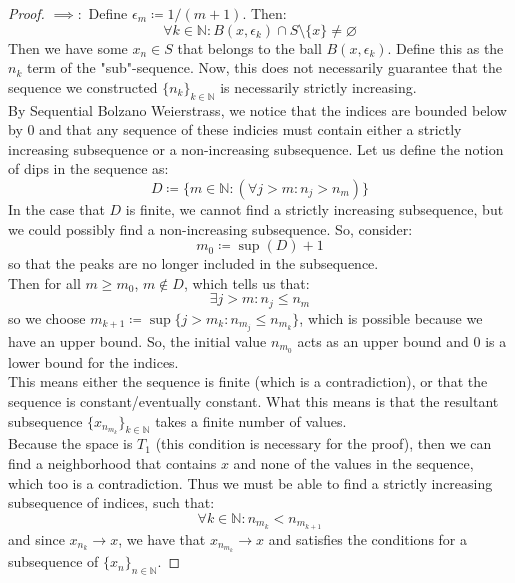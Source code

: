 \documentclass[10pt,letterpaper]{article} %
\begin{document}
\begin{proof}
$\implies:$ Define $\epsilon_m \coloneq 1/(m+1)$. Then:
\begin{equation*}
\forall k \in \mathbb{N}: B(x, \epsilon_k) \cap S \setminus \{x\} \neq \varnothing
\end{equation*}
Then we have some $x_n \in S$ that belongs to the ball $B(x, \epsilon_k)$. Define this as the $n_k$ term of the "sub"-sequence. Now, this does not necessarily guarantee that the sequence we constructed $\{n_k\}_{k \in \mathbb{N}}$ is necessarily strictly increasing.\\

By Sequential Bolzano Weierstrass, we notice that the indices are bounded below by $0$ and that any sequence of these indicies must contain either a strictly increasing subsequence or a non-increasing subsequence. Let us define the notion of dips in the sequence as:
\begin{equation*}
D \coloneq \{m \in \mathbb{N}: (\forall j > m: n_j > n_m)\}
\end{equation*}
In the case that $D$ is finite, we cannot find a strictly increasing subsequence, but we could possibly find a non-increasing subsequence. So, consider:
\begin{equation*}
m_0 \coloneq \sup (D) + 1
\end{equation*}
so that the peaks are no longer included in the subsequence.\\ 

Then for all $m \geqslant m_0$, $m \notin D$, which tells us that:
\begin{equation*}
\exists j > m: n_j \leqslant n_m
\end{equation*}
so we choose $m_{k+1} \coloneq \sup\{j > m_k : n_{m_j} \leqslant n_{m_k}\}$, which is possible because we have an upper bound. So, the initial value $n_{m_0}$ acts as an upper bound and $0$ is a lower bound for the indices.\\

This means either the sequence is finite (which is a contradiction), or that the sequence is constant/eventually constant. What this means is that the resultant subsequence $\{x_{n_{m_k}}\}_{k \in \mathbb{N}}$ takes a finite number of values.\\

Because the space is $T_1$ (this condition is necessary for the proof), then we can find a neighborhood that contains $x$ and none of the values in the sequence, which too is a contradiction. Thus we must be able to find a strictly increasing subsequence of indices, such that:
\begin{equation*}
\forall k \in \mathbb{N}: n_{m_k} < n_{m_{k+1}}
\end{equation*} 
and since $x_{n_k} \xrightarrow{} x$, we have that $x_{n_{m_k}} \xrightarrow{} x$ and satisfies the conditions for a subsequence of $\{x_n\}_{n \in \mathbb{N}}$. 


\end{proof}
\end{document}
